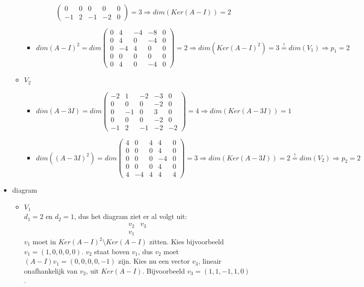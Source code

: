\documentclass[main.tex]{subfiles}
\begin{document}
\begin{itemize}
\begin{itemize}
\begin{itemize}
\[\begin{pmatrix}
        0 & 0 & 0 & 0 & 0\\
        -1 & 2 & -1 & -2 & 0
      \end{pmatrix}
      = 3 \Rightarrow dim(Ker(A-I)) = 2
      \]
    \item
      \[ dim(A-I)^{2} = dim
      \begin{pmatrix}
        0 & 4 & -4 & -8 & 0\\
        0 & 4 & 0 & -4 & 0\\
        0 & -4 & 4 & 0 & 0\\
        0 & 0 & 0 & 0 & 0\\
        0 & 4 & 0 & -4 & 0
      \end{pmatrix}
      = 2 \Rightarrow dim(Ker(A-I)^{2}) = 3 \overset{!}{=} dim(V_{1})
      \Rightarrow p_{1} = 2
      \]
    \end{itemize}
  \item $V_{2}$
    \begin{itemize}
    \item
      \[
      dim(A-3I) = dim
      \begin{pmatrix}
        -2 & 1 & -2 & -3 & 0\\
        0 & 0 & 0  & -2 & 0\\
        0 & -1 & 0 & 3 & 0\\
        0 & 0 & 0 & -2 & 0\\
        -1 & 2 & -1 & -2 & -2
      \end{pmatrix}
      =  4 \Rightarrow dim(Ker(A-3I)) = 1
      \]
    \item 
      \[ 
      dim((A-3I)^{2}) = dim
      \begin{pmatrix}
        4 & 0 & 4 & 4 & 0\\
        0 & 0 & 0 & 4 & 0\\
        0 & 0 & 0 & -4& 0\\
        0 & 0 & 0 & 4 & 0\\
        4 & -4 & 4 & 4 & 4
      \end{pmatrix}
      = 3 \Rightarrow dim(Ker(A-3I)) = 2 \overset{!}{=} dim(V_{2}) \Rightarrow p_{2} = 2
      \]
    \end{itemize}
  \end{itemize}
\item diagram
  \begin{itemize}
  \item $V_{1}$\\
    $d_{1} = 2$ en $d_{2} = 1$, dus het diagram ziet er al volgt uit:
    \[
    \begin{array}{cc}
      \boxed{v_{2}} & \boxed{v_{3}}\\
      \boxed{v_{1}}
    \end{array}
    \] 
    $v_{1}$ moet in $Ker(A-I)^{2}\setminus Ker(A-I)$ zitten.
    Kies bijvoorbeeld $v_{1} = (1,0,0,0,0)$.
    $v_{2}$ staat boven $v_{1}$, dus $v_{2}$ moet $(A-I)v_{1}= (0,0,0,0,-1)$ zijn.
    Kies nu een vector $v_{3}$, lineair onafhankelijk van $v_{2}$, uit $Ker(A-I)$.
    Bijvoorbeeld $v_{3} = (1,1,-1,1,0)$.
    

\end{itemize}
\end{itemize}
\end{document}
